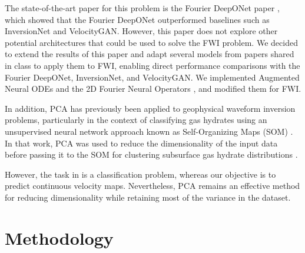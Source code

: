 \documentclass{article}
\newcommand{\instructions}[1]{{\color{blue} #1}}
\begin{document}
The state-of-the-art paper for this problem is the Fourier DeepONet paper \cite{fdonet}, which showed that the Fourier DeepONet outperformed baselines such as InversionNet and VelocityGAN. However, this paper does not explore other potential architectures that could be used to solve the FWI problem. We decided to extend the results of this paper and adapt several models from papers shared in class to apply them to FWI, enabling direct performance comparisons with the Fourier DeepONet, InversionNet, and VelocityGAN. We implemented Augmented Neural ODEs \cite{anode} and the 2D Fourier Neural Operators \cite{fno}, and modified them for FWI.

In addition, PCA has previously been applied to geophysical waveform inversion problems, particularly in the context of classifying gas hydrates using an unsupervised neural network approach known as Self-Organizing Maps (SOM) \cite{jones2023waveform} . In that work, PCA was used to reduce the dimensionality of the input data before passing it to the SOM for clustering subsurface gas hydrate distributions \cite{jones2023waveform}. %



However, the task in \cite{jones2023waveform} is a classification problem, whereas our objective is to predict continuous velocity maps. Nevertheless, PCA remains an effective method for reducing dimensionality while retaining most of the variance in the dataset.

\section{Methodology}
\end{document}

